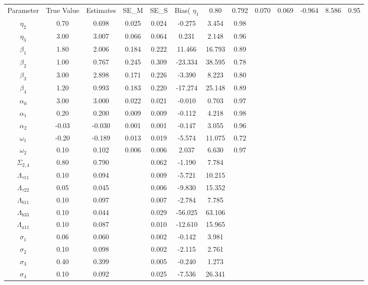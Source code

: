 \begin{table}[ht]
\centering
\begin{tabular}{cccccccc}
  \hline
Parameter & True Value & Estimates & SE_M & SE_S & Bias(%
  \hline
$\eta_1$ & 0.80 & 0.792 & 0.070 & 0.069 & -0.964 & 8.586 & 0.95 \\ 
  $\eta_2$ & 0.70 & 0.698 & 0.025 & 0.024 & -0.275 & 3.454 & 0.98 \\ 
  $\eta_3$ & 3.00 & 3.007 & 0.066 & 0.064 & 0.231 & 2.148 & 0.96 \\ 
  $\beta_1$ & 1.80 & 2.006 & 0.184 & 0.222 & 11.466 & 16.793 & 0.89 \\ 
  $\beta_2$ & 1.00 & 0.767 & 0.245 & 0.309 & -23.334 & 38.595 & 0.78 \\ 
  $\beta_3$ & 3.00 & 2.898 & 0.171 & 0.226 & -3.390 & 8.223 & 0.80 \\ 
  $\beta_4$ & 1.20 & 0.993 & 0.183 & 0.220 & -17.274 & 25.148 & 0.89 \\ 
  $\alpha_0$ & 3.00 & 3.000 & 0.022 & 0.021 & -0.010 & 0.703 & 0.97 \\ 
  $\alpha_1$ & 0.20 & 0.200 & 0.009 & 0.009 & -0.112 & 4.218 & 0.98 \\ 
  $\alpha_2$ & -0.03 & -0.030 & 0.001 & 0.001 & -0.147 & 3.055 & 0.96 \\ 
  $\omega_1$ & -0.20 & -0.189 & 0.013 & 0.019 & -5.574 & 11.075 & 0.72 \\ 
  $\omega_2$ & 0.10 & 0.102 & 0.006 & 0.006 & 2.037 & 6.630 & 0.97 \\ 
   \hline
$\Sigma_{2,4}$ & 0.80 & 0.790 &  & 0.062 & -1.190 & 7.784 &  \\ 
  $\Lambda_{\tau11}$ & 0.10 & 0.094 &  & 0.009 & -5.721 & 10.215 &  \\ 
  $\Lambda_{\tau22}$ & 0.05 & 0.045 &  & 0.006 & -9.830 & 15.352 &  \\ 
  $\Lambda_{b11}$ & 0.10 & 0.097 &  & 0.007 & -2.784 & 7.785 &  \\ 
  $\Lambda_{b33}$ & 0.10 & 0.044 &  & 0.029 & -56.025 & 63.106 &  \\ 
  $\Lambda_{a11}$ & 0.10 & 0.087 &  & 0.010 & -12.610 & 15.965 &  \\ 
  $\sigma_1$ & 0.06 & 0.060 &  & 0.002 & -0.142 & 3.981 &  \\ 
  $\sigma_2$ & 0.10 & 0.098 &  & 0.002 & -2.115 & 2.761 &  \\ 
  $\sigma_3$ & 0.40 & 0.399 &  & 0.005 & -0.240 & 1.273 &  \\ 
  $\sigma_4$ & 0.10 & 0.092 &  & 0.025 & -7.536 & 26.341 &  \\ 
   \hline
\end{tabular}
\end{table}
